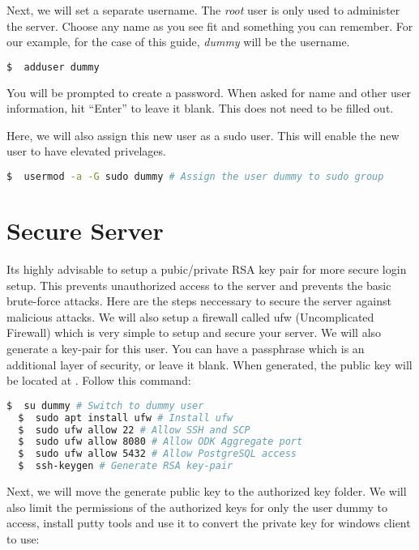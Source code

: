 \noindent
Next, we will set a separate username. The \emph{root} user is only used to administer the server.  Choose any name as you see fit and something you can remember. For our example, for the case of this guide, \emph{dummy} will be the username.

\begin{lstlisting}[language=bash]
  $  adduser dummy
\end{lstlisting}

\noindent
You will be prompted to create a password. When asked for name and other user information, hit ``Enter'' to leave it blank. This does not need to be filled out.


\noindent Here, we will also assign this new user as a sudo user. This will enable the new user to have elevated privelages.

\begin{lstlisting}[language=bash]
  $  usermod -a -G sudo dummy # Assign the user dummy to sudo group
\end{lstlisting}




\section*{Secure Server}



\noindent
Its highly advisable to setup a pubic/private RSA key pair for more secure login setup. This prevents unauthorized access to the server and prevents the basic brute-force attacks. Here are the steps neccessary to secure the server against malicious attacks. We will also setup a firewall called ufw (Uncomplicated Firewall) which is very simple to setup and secure your server. We will also generate a key-pair for this user. You can have a passphrase which is an additional layer of security, or leave it blank. When generated, the public key will be located at . Follow this command:

\begin{lstlisting}[language=bash]
  $  su dummy # Switch to dummy user
  $  sudo apt install ufw # Install ufw
  $  sudo ufw allow 22 # Allow SSH and SCP
  $  sudo ufw allow 8080 # Allow ODK Aggregate port
  $  sudo ufw allow 5432 # Allow PostgreSQL access
  $  ssh-keygen # Generate RSA key-pair

\end{lstlisting}

\noindent
Next, we will move the generate public key to the authorized key folder. We will also limit the permissions of the authorized keys for only the user dummy to access, install putty tools and use it to convert the private key for windows client to use:


